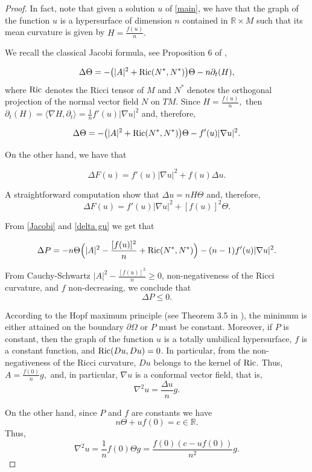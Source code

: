 \documentclass[12pt]{amsart}
\theoremstyle{plain}
\numberwithin{equation}{section}
\begin{document}
\begin{proof}
In fact, note that given a solution $u$ of \eqref{main}, we have that the graph of the function $u$ is a hypersurface of dimension $n$ contained in $\mathbb{R}\times M$ such that its mean curvature is given by $H=\frac{f(u)}{n}.$

We recall the classical Jacobi formula, see Proposition 6 of \cite{ADR07},

$$\Delta\Theta=-\big(|A|^2+{\rm Ric}(N^*,N^*)\big)\Theta-n\partial_t(H),$$
where ${\rm Ric}$ denotes the Ricci tensor of $M$ and $N^*$ denotes the orthogonal projection of the normal vector field $N$ on $TM.$ Since $H=\frac{f(u)}{n},$ then $\partial_t(H)=\langle \nabla H, \partial_t\rangle=\frac{1}{n}f'(u)|\nabla u|^2$
and, therefore, 

\begin{equation}\label {Jacobi}
    \Delta\Theta=-\big(|A|^2+{\rm Ric}(N^*,N^*)\big)\Theta - f'(u)|\nabla u|^2.
\end{equation}

On the other hand, we have that

$$\Delta F(u)=f'(u)|\nabla  u|^2+f(u)\Delta u.$$

A straightforward computation show that $\Delta u=nH\Theta$ and, therefore,
\begin{equation}\label{delta gu}
    \Delta F(u)=f'(u)|\nabla u|^2+[f(u)]^2\Theta.
\end{equation}

From \eqref{Jacobi} and \eqref{delta gu} we get that

$$\Delta P=-n\Theta\Big(|A|^2-\frac{[f(u)]^2}{n}+ {\rm Ric}(N^*,N^*)\Big) - (n-1)f'(u)|\nabla u|^2.$$

From Cauchy-Schwartz  $|A|^2-\frac{[f(u)]^2}{n}\geq 0$, non-negativeness of the Ricci curvature, and $f$ non-decreasing, we conclude that 
$$\Delta P\leq 0.$$


According to the Hopf maximum principle (see Theorem 3.5 in \cite{GT98}), the minimum is either attained on the boundary $\partial\Omega$ or $P$ must be constant.
Moreover, if $P$ is constant, then the graph of the function $u$ is a totally umbilical hypersurface, $f$ is a constant function, and ${\rm Ric}(Du, Du)=0$. In particular, from the non-negativeness of the Ricci curvature, $Du$ belongs to the kernel of ${\rm Ric}$. Thus, $A=\frac{f(0)}{n}g,$ and, in particular, $\nabla u$ is a conformal vector field, that is, 
$$\nabla^2u=\frac{\Delta u}{n}g.$$

On the other hand, since $P$ and $f$ are constants we have 
$$n\Theta+uf(0)=c\in\mathbb{R}.$$
Thus,
$$\nabla^2u=\frac{1}{n}f(0)\Theta g=\frac{f(0)(c-uf(0))}{n^2}g.$$


\end{proof}
\end{document}
